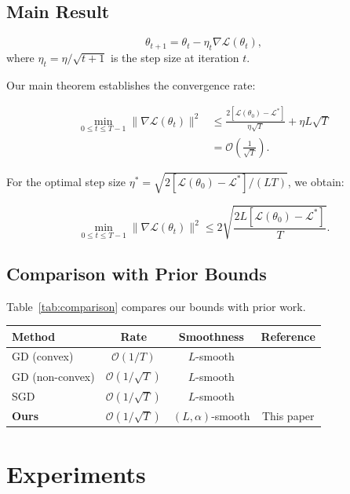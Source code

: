 \documentclass[11pt]{article}
\begin{document}
\subsection{Main Result}

\begin{equation}
\theta_{t+1} = \theta_t - \eta_t \nabla \mathcal{L}(\theta_t),
\end{equation}
where $\eta_t = \eta / \sqrt{t+1}$ is the step size at iteration $t$.

Our main theorem establishes the convergence rate:

\begin{align}\label{eq:convergence}
\min_{0 \leq t \leq T-1} \|\nabla \mathcal{L}(\theta_t)\|^2
  &\leq \frac{2[\mathcal{L}(\theta_0) - \mathcal{L}^*]}{\eta \sqrt{T}}
     + \eta L \sqrt{T} \\
  &= \mathcal{O}\left(\frac{1}{\sqrt{T}}\right). \nonumber
\end{align}

For the optimal step size $\eta^* = \sqrt{2[\mathcal{L}(\theta_0) -
\mathcal{L}^*] / (LT)}$, we obtain:

\begin{equation*}
\min_{0 \leq t \leq T-1} \|\nabla \mathcal{L}(\theta_t)\|^2
  \leq 2\sqrt{\frac{2L[\mathcal{L}(\theta_0) - \mathcal{L}^*]}{T}}.
\end{equation*}

\subsection{Comparison with Prior Bounds}

Table~\ref{tab:comparison} compares our bounds with prior work.

\begin{tabular}{lccc}
\toprule
Method & Rate & Smoothness & Reference \\
\midrule
GD (convex) & $\mathcal{O}(1/T)$ & $L$-smooth & \cite{nesterov2004} \\
GD (non-convex) & $\mathcal{O}(1/\sqrt{T})$ & $L$-smooth & \cite{nesterov2004} \\
SGD & $\mathcal{O}(1/\sqrt{T})$ & $L$-smooth & \cite{robbins1951} \\
\textbf{Ours} & $\mathcal{O}(1/\sqrt{T})$ & $(L,\alpha)$-smooth & This paper \\
\bottomrule
\end{tabular}

\section{Experiments}\label{sec:experiments}
\end{document}
